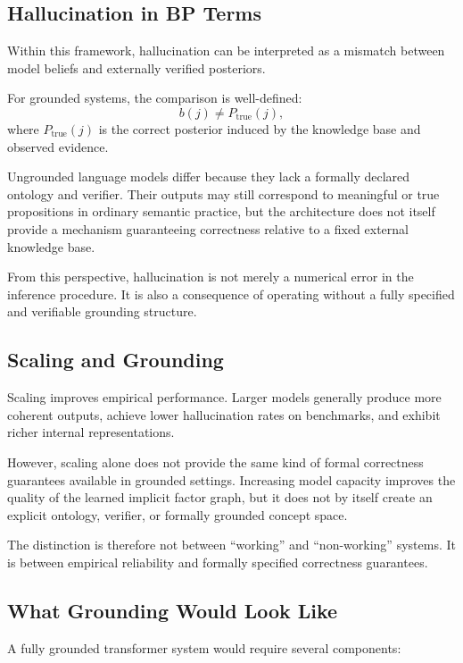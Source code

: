 \subsection*{Hallucination in BP Terms}

Within this framework, hallucination can be interpreted as a mismatch
between model beliefs and externally verified posteriors.

For grounded systems, the comparison is well-defined:
\[
b(j) \neq P_{\mathrm{true}}(j),
\]
where $P_{\mathrm{true}}(j)$ is the correct posterior induced by the
knowledge base and observed evidence.

Ungrounded language models differ because they lack a formally declared
ontology and verifier. Their outputs may still correspond to meaningful
or true propositions in ordinary semantic practice, but the architecture
does not itself provide a mechanism guaranteeing correctness relative to
a fixed external knowledge base.

From this perspective, hallucination is not merely a numerical error in
the inference procedure. It is also a consequence of operating without a
fully specified and verifiable grounding structure.

\subsection*{Scaling and Grounding}

Scaling improves empirical performance. Larger models generally produce
more coherent outputs, achieve lower hallucination rates on benchmarks,
and exhibit richer internal representations.

However, scaling alone does not provide the same kind of formal
correctness guarantees available in grounded settings. Increasing model
capacity improves the quality of the learned implicit factor graph, but
it does not by itself create an explicit ontology, verifier, or formally
grounded concept space.

The distinction is therefore not between ``working'' and ``non-working''
systems. It is between empirical reliability and formally specified
correctness guarantees.

\subsection*{What Grounding Would Look Like}

A fully grounded transformer system would require several components:

